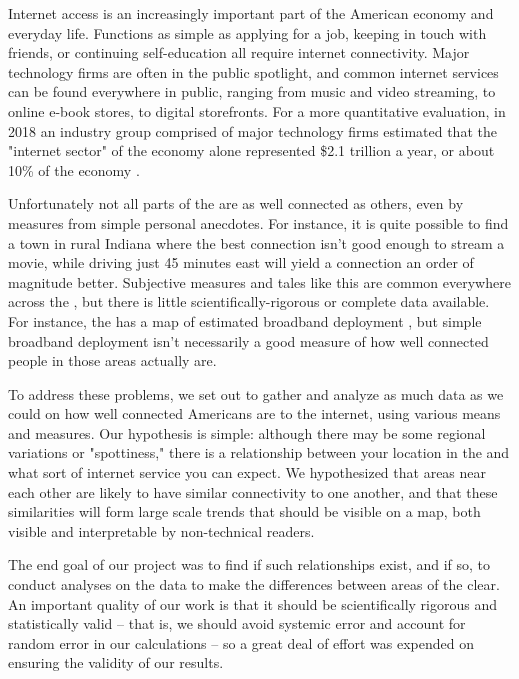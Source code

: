 Internet access is an increasingly important part of the American economy and everyday life. Functions as simple as applying for a job, keeping in touch with friends, or continuing self-education all require internet connectivity. Major technology firms are often in the public spotlight, and common internet services can be found everywhere in public, ranging from music and video streaming, to online e-book stores, to digital storefronts. For a more quantitative evaluation, in 2018 an industry group comprised of major technology firms estimated that the "internet sector" of the economy alone represented \$2.1 trillion a year, or about 10\% of the \us economy \cite{Shepardson2019a}.

Unfortunately not all parts of the \us are as well connected as others, even by measures from simple personal anecdotes. For instance, it is  quite possible to find a town in rural Indiana where the best connection isn't good enough to stream a movie, while driving just 45 minutes east will yield a connection an order of magnitude better. Subjective measures and tales like this are common everywhere across the \us, but there is little scientifically-rigorous or complete data available. For instance, the \fcc has a map of estimated broadband deployment \cite{FederalCommunicationsCommission}, but simple broadband deployment isn't necessarily a good measure of how well connected people in those areas actually are.

To address these problems, we set out to gather and analyze as much data as we could on how well connected Americans are to the internet, using various means and measures. Our hypothesis is simple: although there may be some regional variations or "spottiness," there is a relationship between your location in the \us and what sort of internet service you can expect. We hypothesized that areas near each other are likely to have similar connectivity to one another, and that these similarities will form large scale trends that should be visible on a map, both visible and interpretable by non-technical readers.

The end goal of our project was to find if such relationships exist, and if so, to conduct analyses on the data to make the differences between areas of the \us clear. An important quality of our work is that it should be scientifically rigorous and statistically valid -- that is, we should avoid systemic error and account for random error in our calculations -- so a great deal of effort was expended on ensuring the validity of our results.


